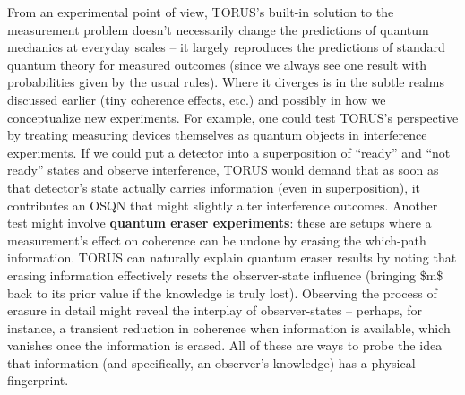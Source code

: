 \documentclass[
]{article}
\begin{document}
From an experimental point of view, TORUS's built-in solution to the
measurement problem doesn't necessarily change the predictions of
quantum mechanics at everyday scales -- it largely reproduces the
predictions of standard quantum theory for measured outcomes (since we
always see one result with probabilities given by the usual rules).
Where it diverges is in the subtle realms discussed earlier (tiny
coherence effects, etc.) and possibly in how we conceptualize new
experiments. For example, one could test TORUS's perspective by treating
measuring devices themselves as quantum objects in interference
experiments. If we could put a detector into a superposition of
``ready'' and ``not ready'' states and observe interference, TORUS would
demand that as soon as that detector's state actually carries
information (even in superposition), it contributes an OSQN that might
slightly alter interference outcomes. Another test might involve
\textbf{quantum eraser experiments}: these are setups where a
measurement's effect on coherence can be undone by erasing the
which-path information. TORUS can naturally explain quantum eraser
results by noting that erasing information effectively resets the
observer-state influence (bringing \$m\$ back to its prior value if the
knowledge is truly lost). Observing the process of erasure in detail
might reveal the interplay of observer-states -- perhaps, for instance,
a transient reduction in coherence when information is available, which
vanishes once the information is erased. All of these are ways to probe
the idea that information (and specifically, an observer's knowledge)
has a physical fingerprint.
\end{document}
